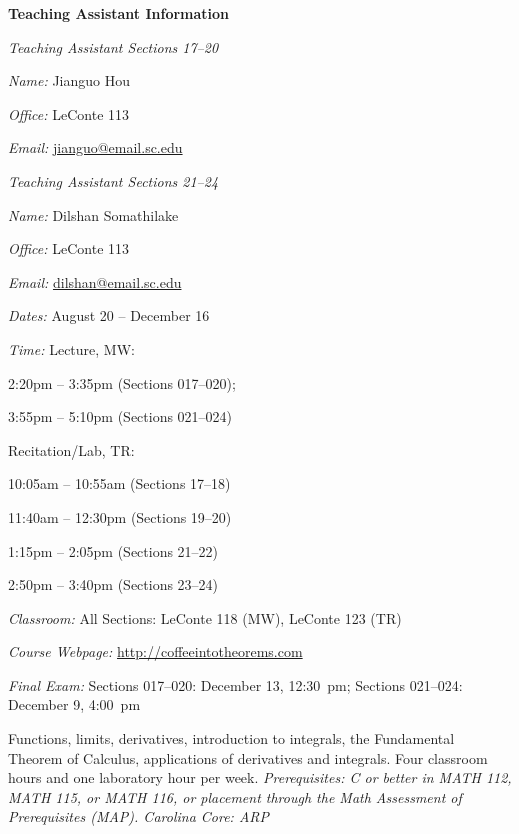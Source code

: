 \documentclass[11pt,letterpaper]{article}
\newcommand{\classdates}{August 20 -- December 16}
\newcommand{\classtimes}{Lecture, MW: \par \hspace{1.5cm} 2:20pm -- 3:35pm (Sections 017--020); \par \hspace{1.5cm} 3:55pm -- 5:10pm (Sections 021--024) \par \hspace{0.95cm} Recitation/Lab, TR: \par \hspace{1.5cm} 10:05am -- 10:55am (Sections 17--18) \par \hspace{1.5cm} 11:40am -- 12:30pm (Sections 19--20) \par \hspace{1.5cm} 1:15pm -- 2:05pm (Sections 21--22) \par \hspace{1.5cm} 2:50pm -- 3:40pm (Sections 23--24)}
\newcommand{\classroom}{All Sections: LeConte 118 (MW), LeConte 123 (TR)}
\newcommand{\website}{http://coffeeintotheorems.com}
\begin{document}
{\bfseries\color{scred} Teaching Assistant Information} \par \vspace{0.1cm}
\hspace{0.25cm} \begin{minipage}[b]{0.4\textwidth}
        {\itshape Teaching Assistant Sections 17--20} \par
        \textit{Name:} Jianguo Hou \par
        \textit{Office:} LeConte 113 \par
        \textit{Email:} \href{mailto:jianguo@email.sc.edu}{jianguo@email.sc.edu} 
\end{minipage}\begin{minipage}[b]{0.4\textwidth}
        {\itshape Teaching Assistant Sections 21--24} \par
        \textit{Name:} Dilshan Somathilake \par
        \textit{Office:}  LeConte 113 \par
        \textit{Email:} \href{mailto:dilshan@email.sc.edu}{dilshan@email.sc.edu} 
\end{minipage}
\pspace


\textit{Dates:} \classdates \par
\textit{Time:} \classtimes \par
\textit{Classroom:} \classroom \par
\textit{Course Webpage:} \href{\website}{\website} \par
\textit{Final Exam:} Sections 017--020: December 13, 12:30~pm; Sections 021--024: December 9, 4:00~pm
\sectionbreak




Functions, limits, derivatives, introduction to integrals, the Fundamental Theorem of Calculus, applications of derivatives and integrals. Four classroom hours and one laboratory hour per week. {\itshape Prerequisites: C or better in MATH 112, MATH 115, or MATH 116, or placement through the Math Assessment of Prerequisites (MAP). Carolina Core: ARP}
\sectionbreak



\end{document}
